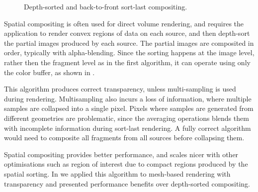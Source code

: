 \begin{figure}[h!t]\center
  \hfil
  \caption{Depth-sorted and back-to-front sort-last compositing.}
\end{figure}

Spatial compositing is often used for direct volume rendering, and requires the
application to render convex regions of data on each source, and then depth-sort
the partial images produced by each source. The partial images are composited in
order, typically with alpha-blending. Since the sorting happens at the image
level, rather then the fragment level as in the first algorithm, it can operate
using only the color buffer, as shown in .

This algorithm produces correct transparency, unless multi-sampling is used
during rendering. Multisampling also incurs a loss of information, where
multiple samples are collapsed into a single pixel. Pixels where samples are
generated from different geometries are problematic, since the averaging
operations blends them with incomplete information during sort-last rendering.
A fully correct algorithm would need to composite all fragments from all
sources before collapsing them.

Spatial compositing provides better performance, and scales nicer with other
optimisations such as region of interest due to compact regions produced by the
spatial sorting. In \cite{EBAHMP:12} we applied this algorithm to mesh-based
rendering with transparency and presented performance benefits over
depth-sorted compositing.

